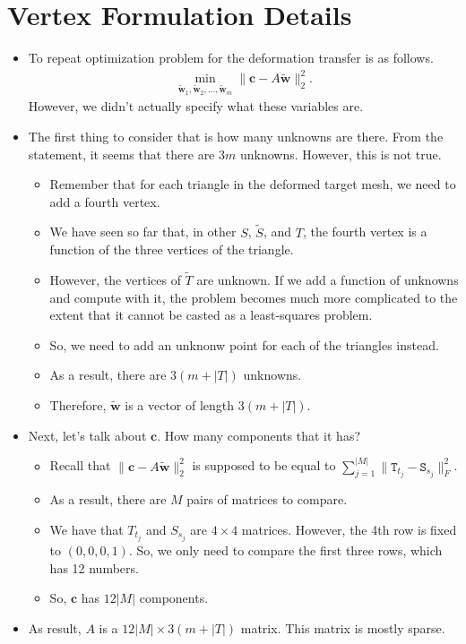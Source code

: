 \documentclass[10pt]{article}
\newcommand{\ve}[1]{\mathbf{#1}}
\newcommand{\mtt}[1]{\mathtt{#1}}
\begin{document}
\section{Vertex Formulation Details}

\begin{itemize}
    \item To repeat optimization problem for the deformation transfer is as follows.
    \begin{align*}
        \min_{\widetilde{\ve{w}}_1, \widetilde{\ve{w}}_2, \ldots, \widetilde{\ve{w}}_m} 
        \| \ve{c} - A\widetilde{\ve{w}} \|_2^2.
    \end{align*}
    However, we didn't actually specify what these variables are.

    \item The first thing to consider that is how many unknowns are there. From the statement, it seems that there are $3m$ unknowns. However, this is not true.
    \begin{itemize}
        \item Remember that for each triangle in the deformed target mesh, we need to add a fourth vertex.
        \item We have seen so far that, in other $S$, $\widetilde{S}$, and $T$, the fourth vertex is a function of the three vertices of the triangle.
        \item However, the vertices of $\widetilde{T}$ are unknown. If we add a function of unknowns and compute with it, the problem becomes much more complicated to the extent that it cannot be casted as a least-squares problem.
        \item So, we need to add an unknonw point for each of the triangles instead.
        \item As a result, there are $3(m + |T|)$ unknowns.
        \item Therefore, $\widetilde{\ve{w}}$ is a vector of length $3(m + |T|)$.
    \end{itemize}

    \item Next, let's talk about $\ve{c}$. How many components that it has?
    \begin{itemize}
        \item Recall that $\| \ve{c} - A\widetilde{\ve{w}} \|_2^2$ is supposed to be equal to $\sum_{j=1}^{|M|} \| \mtt{T}_{t_j} - \mtt{S}_{s_j} \|^2_F$.
        
        \item As a result, there are $M$ pairs of matrices to compare.
    
        \item We have that $T_{t_j}$ and $S_{s_j}$ are $4 \times 4$ matrices. However, the 4th row is fixed to $(0, 0, 0, 1)$. So, we only need to compare the first three rows, which has 12 numbers.
        
        \item So, $\ve{c}$ has $12|M|$ components.
    \end{itemize}

    \item As result, $A$ is a $12|M| \times 3(m + |T|)$ matrix. This matrix is mostly sparse.
\end{itemize}
\end{document}
